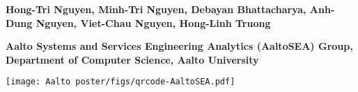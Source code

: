 \documentclass[landscape,a0,final]{a0poster} %
\begin{document}
\begin{minipage}[t]{0.98\linewidth}
\begin{minipage}[t]{0.72\linewidth}
\normalsize{\textsf{\bfseries{Hong-Tri Nguyen, Minh-Tri Nguyen, Debayan Bhattacharya, Anh-Dung Nguyen, Viet-Chau Nguyen, Hong-Linh Truong}}} %

\textcolor{aaltoGray}{\textsf{\bfseries{Aalto Systems and Services Engineering Analytics (AaltoSEA) Group, Department of Computer Science, Aalto University}}}
%
\end{minipage}
\begin{minipage}[t]{0.35\linewidth}
\vspace{-10pt} %

\vspace{0.008\linewidth} %
\texttt{[image: Aalto poster/figs/qrcode-AaltoSEA.pdf]}
\end{minipage}
\end{minipage}


\vspace{0.005\linewidth}

\centering

\small %
\end{document}
